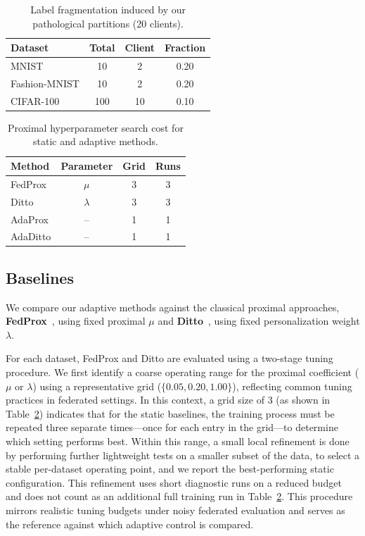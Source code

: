 \documentclass[letterpaper]{article} %
\begin{document}
\begin{table}[tb]
\centering
\small
\setlength{\tabcolsep}{4pt}
\begin{tabular}{lccc}
\toprule
Dataset & Total & Client & Fraction \\
\midrule
MNIST & 10 & 2 & 0.20 \\
Fashion-MNIST & 10 & 2 & 0.20 \\
CIFAR-100 & 100 & 10 & 0.10 \\
\bottomrule
\end{tabular}
\caption{Label fragmentation induced by our pathological partitions (20 clients).}
\label{tab:label_frag}
\end{table}

\begin{table}[tb]
\centering
\begin{tabular}{lccc}
\toprule
Method & Parameter & Grid & Runs \\
\midrule
FedProx & $\mu$ & 3 & 3 \\
Ditto & $\lambda$ & 3 & 3 \\
\midrule
AdaProx & -- & 1 & 1 \\
AdaDitto & -- & 1 & 1 \\
\bottomrule
\end{tabular}
\caption{Proximal hyperparameter search cost for static and adaptive
  methods.}
\label{tab:hpo_cost}
\end{table}

\subsection{Baselines}

We compare our adaptive methods against the classical proximal
approaches, \textbf{FedProx}~\cite{li2020federated}, using fixed
proximal $\mu$ and \textbf{Ditto}~\cite{li2021ditto}, using fixed
personalization weight $\lambda$.

For each dataset, FedProx and Ditto are evaluated using a two-stage
tuning procedure. We first identify a coarse operating range for the
proximal coefficient ($\mu$ or $\lambda$) using a representative grid
($\{0.05, 0.20, 1.00\}$), reflecting common tuning practices in
federated settings. In this context, a grid size of 3 (as shown in
Table~\ref{tab:hpo_cost}) indicates that for the static baselines, the
training process must be repeated three separate times—once for each
entry in the grid—to determine which setting performs best. Within
this range, a small local refinement is done by performing further
lightweight tests on a smaller subset of the data, to select a stable
per-dataset operating point, and we report the best-performing static
configuration.
This refinement uses short diagnostic runs on a reduced budget and
does not count as an additional full training run in
Table~\ref{tab:hpo_cost}.
This procedure mirrors realistic tuning budgets under noisy federated
evaluation and serves as the reference against which adaptive control
is compared.
\end{document}

